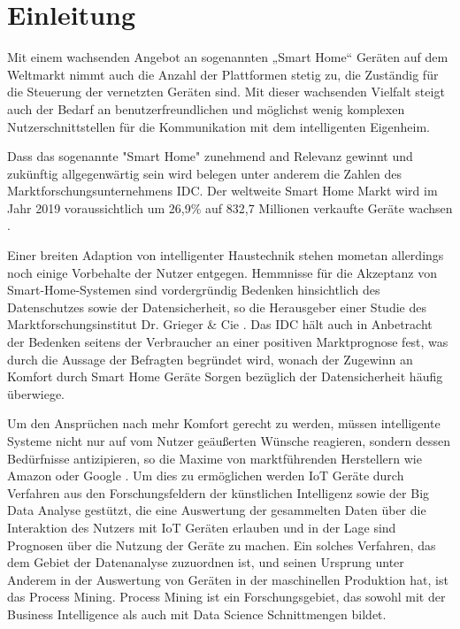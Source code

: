 \chapter{Einleitung}\label{chap:introduction}
Mit einem wachsenden Angebot an sogenannten „Smart Home“ Geräten auf dem Weltmarkt nimmt auch die Anzahl der Plattformen stetig zu, die Zuständig für die Steuerung der vernetzten Geräten sind. Mit dieser wachsenden Vielfalt steigt auch der Bedarf an benutzerfreundlichen und möglichst wenig komplexen Nutzerschnittstellen für die Kommunikation mit dem intelligenten Eigenheim. 

Dass das sogenannte "Smart Home" zunehmend and Relevanz gewinnt und zukünftig allgegenwärtig sein wird belegen unter anderem die Zahlen des  Marktforschungsunternehmens IDC. Der weltweite Smart Home Markt wird im Jahr 2019 voraussichtlich um 26,9\% auf 832,7 Millionen verkaufte Geräte wachsen \cite{IDC}.
 
Einer breiten Adaption von intelligenter Haustechnik stehen mometan allerdings noch einige Vorbehalte der Nutzer entgegen.
Hemmnisse für die Akzeptanz von Smart-Home-Systemen sind vordergründig Bedenken hinsichtlich des Datenschutzes sowie der Datensicherheit, so die Herausgeber einer Studie des Marktforschungsinstitut Dr. Grieger \& Cie \cite{griegercie}. Das IDC hält auch in Anbetracht der Bedenken seitens der Verbraucher an einer positiven Marktprognose fest, was durch die Aussage der Befragten begründet wird, wonach der Zugewinn an Komfort durch Smart Home Geräte Sorgen bezüglich der Datensicherheit häufig überwiege.
 
Um den Ansprüchen nach mehr Komfort gerecht zu werden, müssen intelligente Systeme nicht nur auf vom Nutzer geäußerten Wünsche reagieren, sondern dessen Bedürfnisse antizipieren, so die Maxime von marktführenden Herstellern wie Amazon oder Google \cite{IoTGoogle}. Um dies zu ermöglichen werden IoT Geräte durch Verfahren aus den Forschungsfeldern der künstlichen Intelligenz sowie der Big Data Analyse gestützt, die eine Auswertung der gesammelten Daten über die Interaktion des Nutzers mit IoT Geräten erlauben und in der Lage sind Prognosen über die Nutzung der Geräte zu machen. 
\newpage
Ein solches Verfahren, das dem Gebiet der Datenanalyse zuzuordnen ist, und seinen Ursprung unter Anderem in der Auswertung von Geräten in der maschinellen Produktion hat, ist das Process Mining. Process Mining ist ein Forschungsgebiet, das sowohl mit der Business Intelligence als auch mit Data Science Schnittmengen bildet\cite{PMinAction}. 

